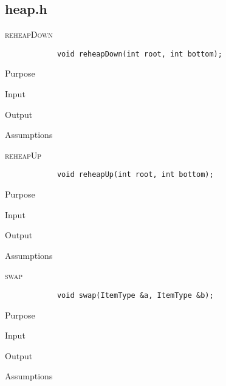 \documentclass[pdftex, 12pt]{article}
\begin{document}
\subsection{heap.h}
\begin{description}

	\item{\textsc{reheapDown}}
		\begin{lstlisting}
			void reheapDown(int root, int bottom);
		\end{lstlisting}
		\begin{description}

			\item{Purpose}

			\item{Input}

			\item{Output}

			\item{Assumptions}

		\end{description}
	\item{\textsc{reheapUp}}
		\begin{lstlisting}
			void reheapUp(int root, int bottom);
		\end{lstlisting}
		\begin{description}

			\item{Purpose}

			\item{Input}

			\item{Output}

			\item{Assumptions}

		\end{description}
	\item{\textsc{swap}}
		\begin{lstlisting}
			void swap(ItemType &a, ItemType &b);
		\end{lstlisting}
		\begin{description}

			\item{Purpose}

			\item{Input}

			\item{Output}

			\item{Assumptions}

		\end{description}
\end{description}
\end{document}
